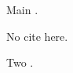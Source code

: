 \documentclass{article}
\begin{document}
Main \cite{alpha}.
\putbib[refs]
\begin{bibunit}[plain]
No cite here.
\putbib[refs]
\end{bibunit}
\begin{bibunit}[plain]
Two \cite{beta}.
\putbib[refs]
\end{bibunit}
\end{document}
